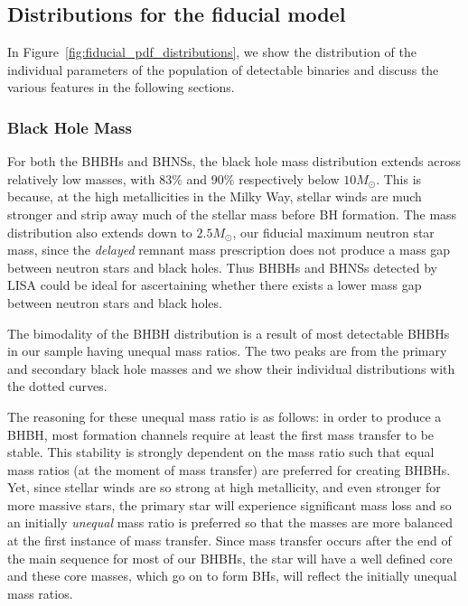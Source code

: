 \subsection{Distributions for the fiducial model}\label{sec:fiducial_distributions}


In Figure~\ref{fig:fiducial_pdf_distributions}, we show the distribution of the individual parameters of the population of detectable binaries and discuss the various features in the following sections.

\subsubsection{Black Hole Mass}
For both the BHBHs and BHNSs, the black hole mass distribution extends across relatively low masses, with $83\%$ and $90\%$ respectively below $10 \unit{M_{\odot}}$. This is because, at the high metallicities in the Milky Way, stellar winds are much stronger and strip away much of the stellar mass before BH formation. The mass distribution also extends down to $2.5 \unit{M_{\odot}}$, our fiducial maximum neutron star mass, since the \citet{Fryer+2012} \textit{delayed} remnant mass prescription does not produce a mass gap between neutron stars and black holes. Thus BHBHs and BHNSs detected by LISA could be ideal for ascertaining whether there exists a lower mass gap between neutron stars and black holes.

The bimodality of the BHBH distribution is a result of most detectable BHBHs in our sample having unequal mass ratios. The two peaks are from the primary and secondary black hole masses and we show their individual distributions with the dotted curves.

The reasoning for these unequal mass ratio is as follows: in order to produce a BHBH, most formation channels require at least the first mass transfer to be stable. This stability is strongly dependent on the mass ratio such that equal mass ratios (at the moment of mass transfer) are preferred for creating BHBHs. Yet, since stellar winds are so strong at high metallicity, and even stronger for more massive stars, the primary star will experience significant mass loss and so an initially \textit{unequal} mass ratio is preferred so that the masses are more balanced at the first instance of mass transfer. Since mass transfer occurs after the end of the main sequence for most of our BHBHs, the star will have a well defined core and these core masses, which go on to form BHs, will reflect the initially unequal mass ratios.

